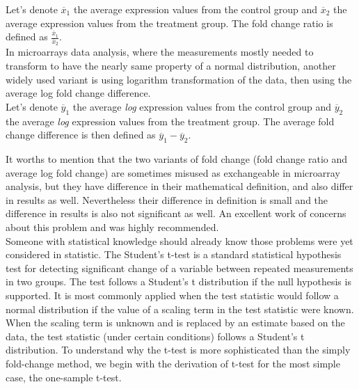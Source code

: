 \begin{definition}
	Let's denote $\overline x_1$ the average expression values from the control group and $\overline x_2$ the average expression values from the treatment group. The fold change ratio is defined as $\frac{\overline x_1}{\overline x_2}$. \\[1ex]
	In microarrays data analysis, where the measurements mostly needed to transform to have the nearly same property of a normal distribution, another widely used variant is using logarithm transformation of the data, then using the average log fold change difference. \\[1ex]
	Let's denote $\overline y_1$ the average {\it log} expression values from the control group and $\overline y_2$ the average {\it log} expression values from the treatment group. The average fold change difference is then defined as $\overline y_1 - \overline y_2$. \
\end{definition}
It worths to mention that the two variants of fold change (fold change ratio and average log fold change) are sometimes misused as exchangeable in microarray analysis, but they have difference in their mathematical definition, and also differ in results as well. Nevertheless their difference in definition is small and the difference in results is also not significant as well. An excellent work of \cite{Tibshirani:2007p29} concerns about this problem and was highly recommended.
\\
Someone with statistical knowledge should already know those problems were yet considered in statistic. The Student's t-test is a standard statistical hypothesis test for detecting significant change of a variable between repeated measurements in two groups. The test follows a Student's t distribution if the null hypothesis is supported. It is most commonly applied when the test statistic would follow a normal distribution if the value of a scaling term in the test statistic were known. When the scaling term is unknown and is replaced by an estimate based on the data, the test statistic (under certain conditions) follows a Student's t distribution.
To understand why the t-test is more sophisticated than the simply fold-change method, we begin with the derivation of t-test for the most simple case, the one-sample t-test. 
